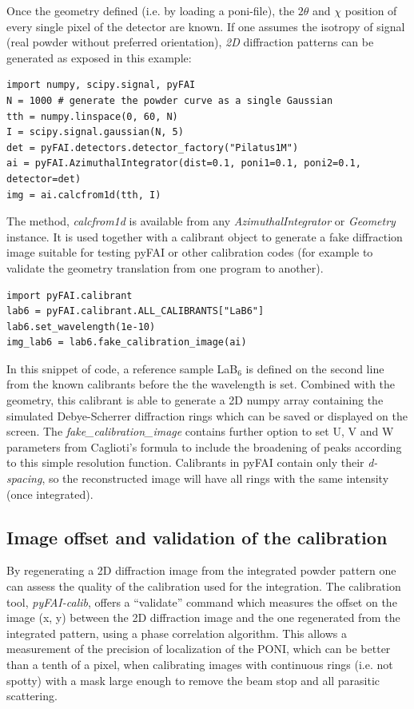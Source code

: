 \documentclass[preprint]{iucr}
\begin{document}
Once the geometry defined (i.e. by loading a poni-file), the $2\theta$ and
$\chi$ position of every single pixel of the detector are known.
If one assumes the isotropy of signal (real powder without preferred
orientation), \textit{2D} diffraction patterns can be generated as exposed in this
example:

\begin{verbatim}
import numpy, scipy.signal, pyFAI
N = 1000 # generate the powder curve as a single Gaussian
tth = numpy.linspace(0, 60, N)
I = scipy.signal.gaussian(N, 5)
det = pyFAI.detectors.detector_factory("Pilatus1M")
ai = pyFAI.AzimuthalIntegrator(dist=0.1, poni1=0.1, poni2=0.1, detector=det)
img = ai.calcfrom1d(tth, I)
\end{verbatim}


The method, \textit{calcfrom1d} is available from any
\textit{AzimuthalIntegrator} or \textit{Geometry} instance.
It is used together with a calibrant object to generate a fake diffraction image
suitable for testing pyFAI or other calibration codes (for example to validate
the geometry translation from one program to another).


\begin{verbatim}
import pyFAI.calibrant
lab6 = pyFAI.calibrant.ALL_CALIBRANTS["LaB6"]
lab6.set_wavelength(1e-10)
img_lab6 = lab6.fake_calibration_image(ai)
\end{verbatim}

In this snippet of code, a reference sample LaB$_6$ is defined on the second
line from the known calibrants before the the wavelength is set.
Combined with the geometry, this calibrant is able to
generate a 2D numpy array containing the simulated Debye-Scherrer diffraction
rings which can be saved or displayed on the screen.
The \textit{fake\_calibration\_image} contains further option to set U, V and W
parameters from Caglioti's formula \cite{caglioti} to include the
broadening of peaks according to this simple resolution function.
Calibrants in pyFAI contain only their \textit{d-spacing}, so the
reconstructed image will have all rings with the same
intensity (once integrated).

\subsection{Image offset and validation of the calibration}
By regenerating a 2D diffraction image from the integrated powder pattern one
can assess the quality of the calibration used for the integration.
The calibration tool, \textit{pyFAI-calib}, offers  a ``validate'' command which
measures the offset on the image (x, y) between the 2D diffraction image and the
one regenerated from the integrated pattern, using a phase correlation
algorithm.
This allows a measurement of the precision of localization of the PONI, which
can be better than a tenth of a pixel, when calibrating images with continuous
rings (i.e. not spotty) with a mask large enough to remove the beam stop and
all parasitic scattering.
\end{document}
